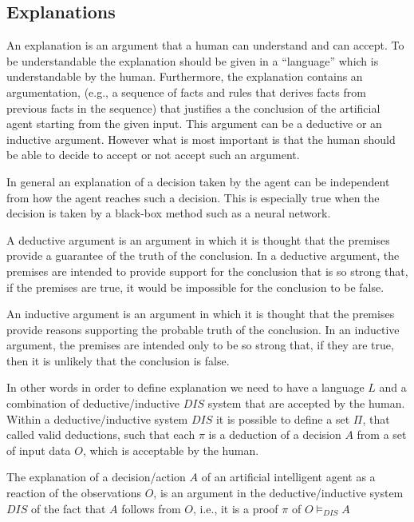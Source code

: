 \subsection{Explanations} 
An explanation is an argument that a human can understand and can
accept. To be understandable the explanation should be given in a
``language'' which is understandable by the human. Furthermore, the
explanation contains an argumentation, (e.g., a sequence of facts and
rules that derives facts from previous facts in the sequence) that
justifies a the conclusion of the artificial agent starting from the
given input. This argument can be a deductive or an inductive
argument. However what is most important is that the human should be
able to decide to accept or not accept such an argument.


In general an explanation of a decision taken by the agent can be
independent from how the agent reaches such a decision. This is
especially true when the decision is taken by a black-box method such
as a neural network. 

A deductive argument is an argument in which it is thought that the
premises provide a guarantee of the truth of the conclusion. In a
deductive argument, the premises are intended to provide support for
the conclusion that is so strong that, if the premises are true, it
would be impossible for the conclusion to be false.

An inductive argument is an argument in which it is thought that the
premises provide reasons supporting the probable truth of the
conclusion. In an inductive argument, the premises are intended only
to be so strong that, if they are true, then it is unlikely that the
conclusion is false.

In other words in order to define explanation we need to have a
language $L$ and a combination of deductive/inductive $DIS$ system
that are accepted by the human. Within a deductive/inductive system
$DIS$ it is possible to define a set $\Pi$, that called valid
deductions, such that each $\pi$ is a deduction of a decision $A$ from
a set of input data $O$, which is acceptable by the human.

\begin{definition}[Explanation]
  The explanation of a decision/action $A$ of an artificial
  intelligent agent as a reaction of the observations 
  $O$, is an argument in the deductive/inductive system $DIS$
  of the fact that $A$ follows from $O$, i.e., it is a proof $\pi$ of
  $O\models_{DIS} A$ 
\end{definition}

